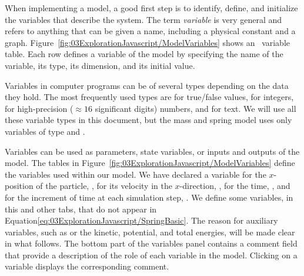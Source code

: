 When implementing a model, a good first step is to identify, define, and initialize the variables that describe the
system. The term \emph{variable} is very general and refers to anything that can be given a name, including a
physical constant and a graph. Figure~\ref{fig:03ExplorationJavascript/ModelVariables} shows an
\ejs\ variable table. Each row defines a variable of the model by specifying the name of the variable, its type, its dimension, and its initial value.

Variables in computer programs can be of several types depending on the data they hold. The most frequently used types are  for true/false values,  for integers,  for high-precision ($\approx 16$ significant digits) numbers, and  for text.  We will use all these variable types in this document, but the mass and spring model uses only variables of type  and .


Variables can be used as parameters,  state variables, or inputs and outputs of the model.  The tables in Figure~\ref{fig:03ExplorationJavascript/ModelVariables} define the variables used within our model.  We have
declared a variable for the $x$-position of the particle, , for its velocity in the
$x$-direction, , for the time, , and for the increment of time at each simulation step, .
We define some variables, in this and other tabs, that do not appear in Equation\eqref{eq:03ExplorationJavascript/SpringBasic}. The reason for auxiliary variables, such as   or the kinetic, potential, and total energies, will be made clear in what follows. The bottom part of the variables panel contains a comment field that provide a description of the role of each variable in the model. Clicking on a variable displays the corresponding comment.

